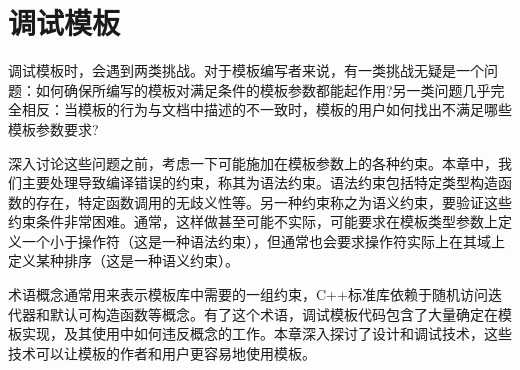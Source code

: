 \chapter{调试模板}
调试模板时，会遇到两类挑战。对于模板编写者来说，有一类挑战无疑是一个问题：如何确保所编写的模板对满足条件的模板参数都能起作用?另一类问题几乎完全相反：当模板的行为与文档中描述的不一致时，模板的用户如何找出不满足哪些模板参数要求?

深入讨论这些问题之前，考虑一下可能施加在模板参数上的各种约束。本章中，我们主要处理导致编译错误的约束，称其为语法约束。语法约束包括特定类型构造函数的存在，特定函数调用的无歧义性等。另一种约束称之为语义约束，要验证这些约束条件非常困难。通常，这样做甚至可能不实际，可能要求在模板类型参数上定义一个小于操作符（这是一种语法约束），但通常也会要求操作符实际上在其域上定义某种排序（这是一种语义约束）。

术语概念通常用来表示模板库中需要的一组约束，C++标准库依赖于随机访问迭代器和默认可构造函数等概念。有了这个术语，调试模板代码包含了大量确定在模板实现，及其使用中如何违反概念的工作。本章深入探讨了设计和调试技术，这些技术可以让模板的作者和用户更容易地使用模板。





